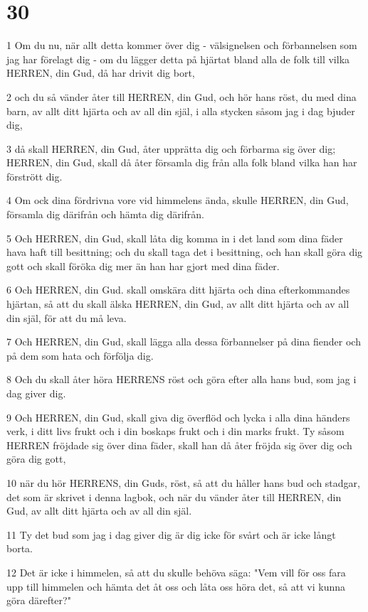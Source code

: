 \chapter{30}

\par 1 Om du nu, när allt detta kommer över dig - välsignelsen och förbannelsen som jag har förelagt dig - om du lägger detta på hjärtat bland alla de folk till vilka HERREN, din Gud, då har drivit dig bort,
\par 2 och du så vänder åter till HERREN, din Gud, och hör hans röst, du med dina barn, av allt ditt hjärta och av all din själ, i alla stycken såsom jag i dag bjuder dig,
\par 3 då skall HERREN, din Gud, åter upprätta dig och förbarma sig över dig; HERREN, din Gud, skall då åter församla dig från alla folk bland vilka han har förstrött dig.
\par 4 Om ock dina fördrivna vore vid himmelens ända, skulle HERREN, din Gud, församla dig därifrån och hämta dig därifrån.
\par 5 Och HERREN, din Gud, skall låta dig komma in i det land som dina fäder hava haft till besittning; och du skall taga det i besittning, och han skall göra dig gott och skall föröka dig mer än han har gjort med dina fäder.
\par 6 Och HERREN, din Gud. skall omskära ditt hjärta och dina efterkommandes hjärtan, så att du skall älska HERREN, din Gud, av allt ditt hjärta och av all din själ, för att du må leva.
\par 7 Och HERREN, din Gud, skall lägga alla dessa förbannelser på dina fiender och på dem som hata och förfölja dig.
\par 8 Och du skall åter höra HERRENS röst och göra efter alla hans bud, som jag i dag giver dig.
\par 9 Och HERREN, din Gud, skall giva dig överflöd och lycka i alla dina händers verk, i ditt livs frukt och i din boskaps frukt och i din marks frukt. Ty såsom HERREN fröjdade sig över dina fäder, skall han då åter fröjda sig över dig och göra dig gott,
\par 10 när du hör HERRENS, din Guds, röst, så att du håller hans bud och stadgar, det som är skrivet i denna lagbok, och när du vänder åter till HERREN, din Gud, av allt ditt hjärta och av all din själ.
\par 11 Ty det bud som jag i dag giver dig är dig icke för svårt och är icke långt borta.
\par 12 Det är icke i himmelen, så att du skulle behöva säga: "Vem vill för oss fara upp till himmelen och hämta det åt oss och låta oss höra det, så att vi kunna göra därefter?"
